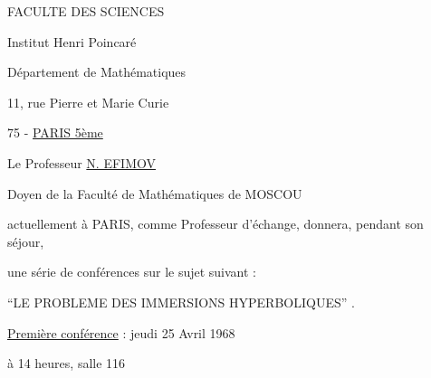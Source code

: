 
FACULTE DES SCIENCES

Institut Henri Poincaré

Département de Mathématiques

11, rue Pierre et Marie Curie

75 - \uline{PARIS 5ème}

\begin{center}
Le Professeur \uline{N. EFIMOV}

Doyen de la Faculté de Mathématiques de MOSCOU
\end{center}

actuellement à PARIS, comme Professeur d'échange, donnera, pendant son séjour,

une série de conférences sur le sujet suivant :

\begin{center}``LE PROBLEME DES IMMERSIONS HYPERBOLIQUES'' .\end{center}

\uline{Première conférence} : jeudi 25 Avril 1968

à 14 heures, salle 116

